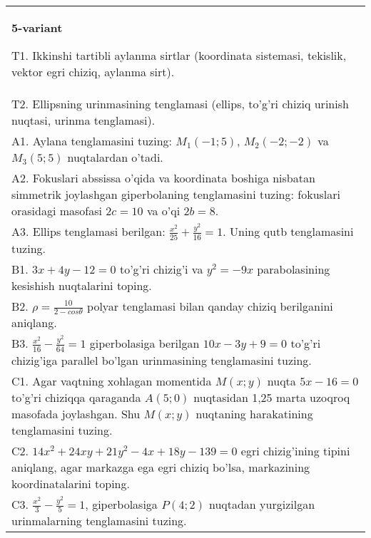 \documentclass{article}
\begin{document}
\begin{tabular}{m{17cm}}
\textbf{5-variant}
\newline

T1. Ikkinshi tartibli aylanma sirtlar (koordinata sistemasi, tekislik, vektor egri chiziq, aylanma sirt).\\

T2. Ellipsning urinmasining tenglamasi (ellips, to'g'ri chiziq urinish nuqtasi, urinma tenglamasi).\\

A1. Aylana tenglamasini tuzing: $M_1(-1;5)$, $M_2(-2;-2)$ va $M_3(5;5)$ nuqtalardan o'tadi.\\

A2. Fokuslari abssissa o'qida va koordinata boshiga nisbatan simmetrik joylashgan giperbolaning tenglamasini tuzing: fokuslari orasidagi masofasi $2c=10$ va o'qi $2b=8$.\\

A3. Ellips tenglamasi berilgan: $\frac{x^2}{25}+\frac{y^2}{16}=1$. Uning qutb tenglamasini tuzing.\\

B1. $3x + 4y - 12 = 0$ to'g'ri chizig'i va $y^{2} = - 9x$ parabolasining kesishish nuqtalarini toping.\\

B2. $\rho = \frac{10}{2 - cos\theta}$ polyar tenglamasi bilan qanday chiziq berilganini aniqlang.  \\

B3. $\frac{x^{2}}{16} - \frac{y^{2}}{64} = 1$ giperbolasiga berilgan $10x - 3y + 9 = 0$ to'g'ri chizig'iga parallel bo'lgan urinmasining tenglamasini tuzing.  \\

C1. Agar vaqtning xohlagan momentida $M(x;y)$ nuqta $5x - 16 = 0$ to'g'ri chiziqqa qaraganda $A(5;0)$ nuqtasidan 1,25 marta uzoqroq masofada joylashgan. Shu $M(x;y)$ nuqtaning harakatining tenglamasini tuzing.  \\

C2. $14x^{2} + 24xy + 21y^{2} - 4x + 18y - 139 = 0$ egri chizig'ining tipini aniqlang, agar markazga ega egri chiziq bo'lsa, markazining koordinatalarini toping.  \\

C3. $\frac{x^{2}}{3} - \frac{y^{2}}{5} = 1$, giperbolasiga $P(4;2)$ nuqtadan yurgizilgan urinmalarning tenglamasini tuzing.  \\

\end{tabular}
\vspace{1cm}
\end{document}
